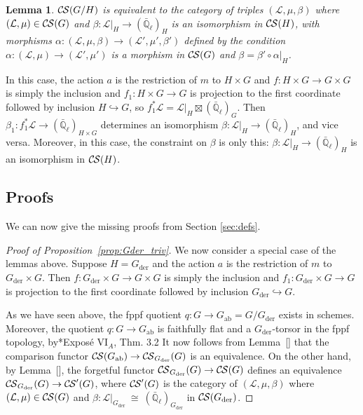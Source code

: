 \documentclass[10pt]{amsart}
\theoremstyle{plain}
\newtheorem{lemma}[theorem]{Lemma}
\theoremstyle{definition}
\newcommand{\EE}{\mathbb{\bar Q}_\ell}
\newcommand{\der}{_{\operatorname{der}}}
\newcommand{\ab}{_{\operatorname{ab}}}
\newcommand{\iso}{{\ \cong\ }}
\newcommand{\cs}[1]{{\mathcal{#1}}}
\newcommand{\CS}{{\mathcal{C\hskip-0.8pt S}}}
\begin{document}
\begin{lemma}
$\CS(G/H)$ is equivalent to the category of triples $(\cs{L},\mu,\beta)$ where $(\cs{L},\mu)\in \CS(G)$ and $\beta : \cs{L}\vert_H \to (\EE)_H$ is an isomorphism in $\CS(H)$, with morphisms $\alpha : (\cs{L},\mu,\beta) \to (\cs{L}',\mu',\beta')$ defined by the condition
$\alpha : (\cs{L},\mu) \to (\cs{L}',\mu')$ is a morphism in $\CS(G)$ and $\beta = \beta' \circ \alpha\vert_{H}$.
\end{lemma}

In this case, the action $a$ is the restriction of $m$ to $H\times G$ and $f : H \times G\to G\times G$ is simply the inclusion and $f_1: H\times G \to G$ is projection to the first coordinate followed by inclusion $H \hookrightarrow G$, so $f_1^*\cs{L} = \cs{L}\vert_{H} \boxtimes (\EE)_G$. 
Then $\beta_1 : f_1^*\cs{L} \to (\EE)_{H\times G}$ determines an isomorphism $\beta : \cs{L}\vert_{H} \to (\EE)_{H}$, and vice versa.
Moreover, in this case, the constraint on $\beta$ is only this: $\beta : \cs{L}\vert_{H} \to (\EE)_{H}$ is an isomorphism in $\CS(H)$. 

\subsection{Proofs}

We can now give the missing proofs from Section \ref{sec:defs}.

\begin{proof}[Proof of Proposition~\ref{prop:Gder_triv}]
We now consider a special case of the lemmas above. 
Suppose $H = G\der$ and the action $a$ is the restriction of $m$ to $G\der\times G$.
Then $f : G\der \times G\to G\times G$ is simply the inclusion and $f_1: G\der\times G \to G$ is projection to the first coordinate followed by inclusion $G\der \hookrightarrow G$. 

As we have seen above, the fppf quotient $q : G\to G\ab = G/G\der$ exists in schemes.
Moreover, the quotient $q : G \to G\ab$ is faithfully flat and a $G\der$-torsor in the fppf topology, by\cite{SGA3}*{Expos\'e {VI}$_A$, Thm. 3.2}
It now follows from Lemma~[] that the comparison functor $\CS(G\ab)\to \CS_{G\der}(G)$ is an equivalence.
On the other hand, by Lemma~[], the forgetful functor $\CS_{G\der}(G)\to \CS(G)$ defines an equivalence $\CS_{G\der}(G)\to \CS'(G)$, where $\CS'(G)$ is the category of $(\cs{L},\mu,\beta)$ where $(\cs{L},\mu)\in \CS(G)$ and $\beta : \cs{L}\vert_{G\der} \iso (\EE)_{G\der}$ in $\CS(G\der)$.
\end{proof}
\end{document}
